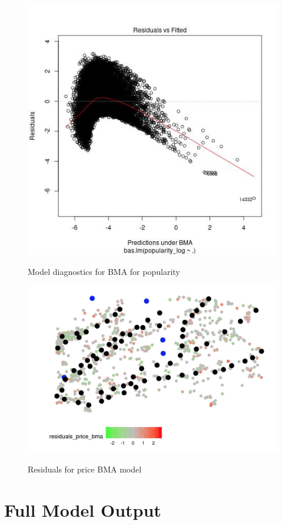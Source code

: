 \documentclass[10pt]{jmlr}%
\begin{document}
\begin{figure}[htbp]
	\centering
	\caption{Model diagnostics for BMA for popularity}
	\includegraphics[width=0.5\linewidth]{pop_diagnostic_plot.jpeg}
	\label{fig:pop_diag}
\end{figure}

\begin{figure}[htbp]
	\centering
	\caption{Residuals for price BMA model}
	\includegraphics[width=0.5\linewidth]{residual_map_price.png}
	\label{fig:map_residuals}
\end{figure}


\newpage  %


\section{Full Model Output}




\end{document}
